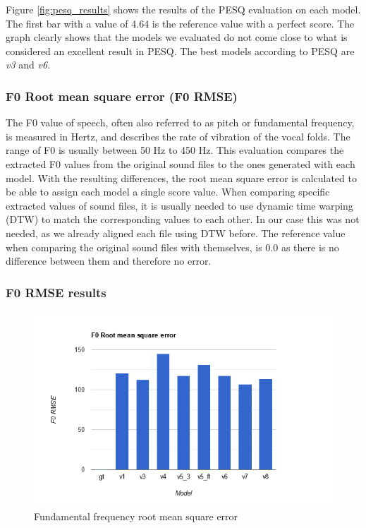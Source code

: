 \documentclass[a4paper]{article}
\begin{document}
Figure \ref{fig:pesq_results} shows the results of the PESQ evaluation on each
model. The first bar with a value of 4.64 is the reference value with a perfect
score. The graph clearly shows that the models we evaluated do not come close to
what is considered an excellent result in PESQ. The best models according to
PESQ are \emph{v3} and \emph{v6}.

\subsubsection{F0 Root mean square error (F0 RMSE)}
The F0 value of speech, often also referred to as pitch or fundamental
frequency, is measured in Hertz, and describes the rate of vibration of the
vocal folds. The range of F0 is usually between 50 Hz to 450 Hz. This evaluation
compares the extracted F0 values from the original sound files to the ones
generated with each model. With the resulting differences, the root mean square
error is calculated to be able to assign each model a single score value. When
comparing specific extracted values of sound files, it is usually needed to use
dynamic time warping (DTW) to match the corresponding values to each other. In
our case this was not needed, as we already aligned each file using DTW before.
The reference value when comparing the original sound files with themselves, is
0.0 as there is no difference between them and therefore no error.

\subsubsection{F0 RMSE results}
\begin{figure}[hbtp]
    \includegraphics[width=\textwidth]{evaluation/graphs/F0RMSE.png}
    \caption{Fundamental frequency root mean square error}
    \label{fig:f0rmse_results}
\end{figure}
\end{document}
